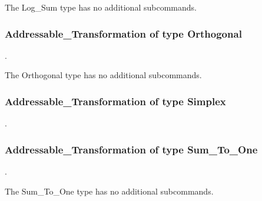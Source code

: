 The Log\_Sum type has no additional subcommands.
\subsubsection{Addressable\_Transformation of type Orthogonal}
.
\label{syntax:AddressableTransformation-Orthogonal}

The Orthogonal type has no additional subcommands.
\subsubsection{Addressable\_Transformation of type Simplex}
.
\label{syntax:AddressableTransformation-Simplex}


\subsubsection{Addressable\_Transformation of type Sum\_To\_One}
.
\label{syntax:AddressableTransformation-SumToOne}

The Sum\_To\_One type has no additional subcommands.
